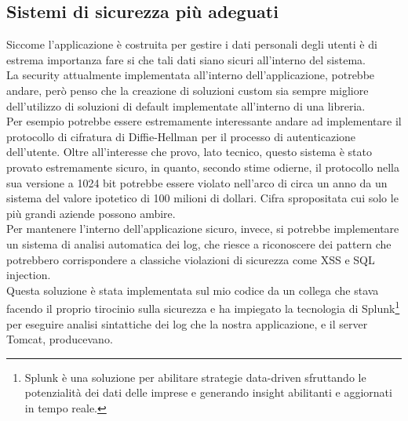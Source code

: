 \subsection{Sistemi di sicurezza più adeguati}
Siccome l'applicazione è costruita per gestire i dati personali degli utenti è di estrema importanza fare si che tali dati siano sicuri all'interno del sistema.
\\
La security attualmente implementata all'interno dell'applicazione, potrebbe andare, però penso che la creazione di soluzioni custom sia sempre migliore dell'utilizzo di soluzioni di default implementate all'interno di una libreria.
\\
Per esempio potrebbe essere estremamente interessante andare ad implementare il protocollo di cifratura di Diffie-Hellman per il processo di autenticazione dell'utente. Oltre all'interesse che provo, lato tecnico, questo sistema è stato provato estremamente sicuro, in quanto, secondo stime odierne\cite{ArsTechnicaDiffieHellman}, il protocollo nella sua versione a 1024 bit potrebbe essere violato nell'arco di circa un anno da un sistema del valore ipotetico di 100 milioni di dollari. Cifra spropositata cui solo le più grandi aziende possono ambire.
\\
Per mantenere l'interno dell'applicazione sicuro, invece, si potrebbe implementare un sistema di analisi automatica dei log, che riesce a riconoscere dei pattern che potrebbero corrispondere a classiche violazioni di sicurezza come XSS e SQL injection.
\\
Questa soluzione è stata implementata sul mio codice da un collega che stava facendo il proprio tirocinio sulla sicurezza e ha impiegato la tecnologia di Splunk\footnote{
Splunk è una soluzione per abilitare strategie data-driven sfruttando le potenzialità dei dati delle imprese e generando insight abilitanti e aggiornati in tempo reale.\cite{SplunkDef}
} per eseguire analisi sintattiche dei log che la nostra applicazione, e il server Tomcat, producevano.

